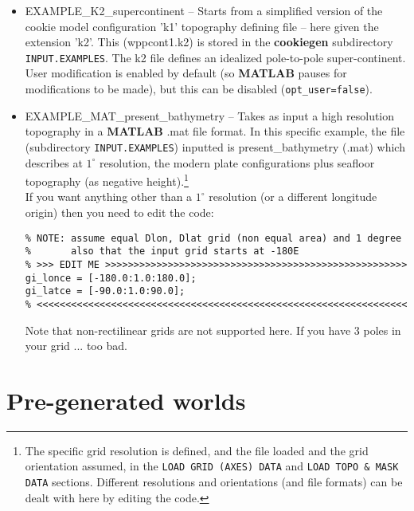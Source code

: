 \begin{itemize}[noitemsep]
\vspace{1mm}
\item \textsf{\footnotesize EXAMPLE\_K2\_supercontinent} -- Starts from a simplified version of the cookie model configuration 'k1' topography defining file -- here given  the extension 'k2'. This (\textsf{\footnotesize wppcont1.k2}) is stored in the \textbf{cookiegen} subdirectory \texttt{INPUT.EXAMPLES}. The k2 file defines an idealized pole-to-pole super-continent. User modification is enabled by default (so \textbf{MATLAB} pauses for modifications to be made), but this can be disabled (\texttt{opt\_user=false}).

\vspace{1mm}
\item \textsf{\footnotesize EXAMPLE\_MAT\_present\_bathymetry} -- Takes as input a high resolution topography in a \textbf{MATLAB} \textsf{\footnotesize .mat} file format. In this specific example, the file (subdirectory \texttt{INPUT.EXAMPLES}) inputted is \textsf{\footnotesize present\_bathymetry} (\textsf{\footnotesize .mat}) which describes at \(1^{\circ}\) resolution, the modern plate configurations plus seafloor topography (as negative height).\footnote{The specific grid resolution is defined, and the file loaded and the grid orientation assumed, in the \texttt{LOAD GRID (AXES) DATA} and \texttt{LOAD TOPO \& MASK DATA} sections. Different resolutions and orientations (and file formats) can be dealt with here by editing the code.}
\\If you want anything other than a \(1^{\circ}\) resolution (or a different longitude origin) then you need to edit the code:
\small\begin{verbatim}
% NOTE: assume equal Dlon, Dlat grid (non equal area) and 1 degree
%       also that the input grid starts at -180E
% >>> EDIT ME >>>>>>>>>>>>>>>>>>>>>>>>>>>>>>>>>>>>>>>>>>>>>>>>>>>>>
gi_lonce = [-180.0:1.0:180.0];
gi_latce = [-90.0:1.0:90.0];
% <<<<<<<<<<<<<<<<<<<<<<<<<<<<<<<<<<<<<<<<<<<<<<<<<<<<<<<<<<<<<<<<<
\end{verbatim}\normalsize
Note that non-rectilinear grids are not supported here. If you have 3 poles in your grid ... too bad.

\end{itemize}
\vspace{2mm}


\newpage

\section{Pre-generated worlds}

